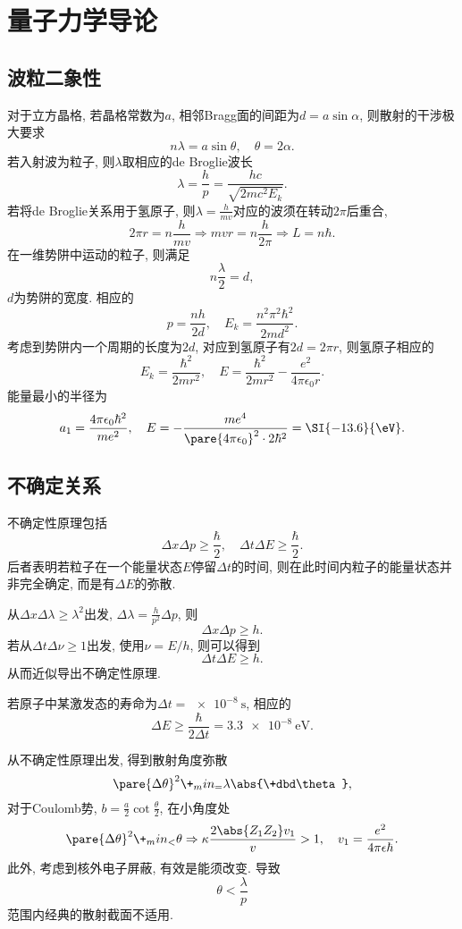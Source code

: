 \documentclass[hidelinks]{ctexart}
\begin{document}
\section{量子力学导论} %
\label{sec:量子力学导论}

\subsection{波粒二象性} %
\label{sub:波粒二象性}

对于立方晶格, 若晶格常数为$a$, 相邻Bragg面的间距为$d=a \sin \alpha$, 则散射的干涉极大要求
\[ n\lambda = a\sin\theta,\quad \theta = 2\alpha. \]
若入射波为粒子, 则$\lambda$取相应的de Broglie波长
\[ \lambda = \frac{h}{p} = \frac{hc}{\sqrt{2mc^2 E_k}}. \]
若将de Broglie关系用于氢原子, 则$\displaystyle \lambda = \frac{h}{mv}$对应的波须在转动$2\pi$后重合,
\[ 2\pi r = n\frac{h}{mv} \Rightarrow mvr = n\frac{h}{2\pi} \Rightarrow L = n\hbar. \]
在一维势阱中运动的粒子, 则满足
\[ n\frac{\lambda}{2} = d, \]
$d$为势阱的宽度. 相应的
\[ p = \frac{nh}{2d},\quad E_k = \frac{n^2\pi^2\hbar^2}{2md^2}. \]
考虑到势阱内一个周期的长度为$2d$, 对应到氢原子有$2d = 2\pi r$,  则氢原子相应的
\[ E_k = \frac{\hbar^2}{2mr^2},\quad E = \frac{\hbar^2}{2mr^2} - \frac{e^2}{4\pi\epsilon_0 r}. \]
能量最小的半径为
\[ a_1 = \frac{4\pi\epsilon_0\hbar^2}{me^2},\quad E = -\frac{me^4}{\pare{4\pi\epsilon_0}^2\cdot 2\hbar^2} = \SI{-13.6}{\eV}. \]


\subsection{不确定关系} %
\label{sub:不确定关系}

不确定性原理包括
\[ \boxed{\Delta x \Delta p \ge \frac{\hbar}{2},\quad \Delta t \Delta E \ge \frac{\hbar}{2}.} \]
后者表明若粒子在一个能量状态$E$停留$\Delta t$的时间, 则在此时间内粒子的能量状态并非完全确定, 而是有$\Delta E$的弥散.
\par
从$\Delta x \Delta \lambda \ge \lambda^2$出发, $\displaystyle \Delta\lambda = \frac{h}{p^2}\Delta p$, 则
\[ \Delta x \Delta p \ge h. \]
若从$\Delta t \Delta \nu \ge 1$出发, 使用$\nu = E/h$, 则可以得到
\[ \Delta t \Delta E \ge h. \]
从而近似导出不确定性原理.
\begin{ex}
    若原子中某激发态的寿命为$\Delta t = \SI{e-8}{\second}$, 相应的
    \[ \Delta E \ge \frac{\hbar}{2\Delta t} = \SI{3.3e-8}{\eV}. \]
\end{ex}
从不确定性原理出发, 得到散射角度弥散
\[ \pare{\Delta\theta}^2\+_min_ = \lambda \abs{\+dbd\theta}, \]
对于Coulomb势, $\displaystyle b = \frac{a}{2}\cot \frac{\theta}{2}$, 在小角度处
\[ \pare{\Delta\theta}^2\+_min_ < \theta \Rightarrow \kappa \frac{2\abs{Z_1Z_2}v_1}{v} > 1,\quad v_1 = \frac{e^2}{4\pi\epsilon \hbar}. \]
此外, 考虑到核外电子屏蔽, 有效是能须改变. 导致
\[ \theta < \frac{\lambda}{p} \]
范围内经典的散射截面不适用.
\end{document}
